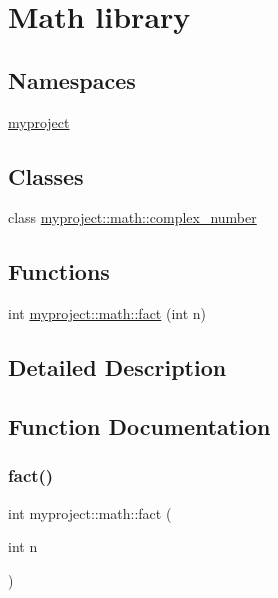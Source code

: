 \hypertarget{group__group__math}{}\section{Math library}
\label{group__group__math}
\subsection*{Namespaces}
\begin{DoxyCompactItemize}
\item 
 \hyperlink{namespacemyproject}{myproject}
\end{DoxyCompactItemize}
\subsection*{Classes}
\begin{DoxyCompactItemize}
\item 
class \hyperlink{classmyproject_1_1math_1_1complex__number}{myproject\+::math\+::complex\+\_\+number}
\end{DoxyCompactItemize}
\subsection*{Functions}
\begin{DoxyCompactItemize}
\item 
int \hyperlink{group__group__math_ga6068ca26852f38cc5dff403589631c1b}{myproject\+::math\+::fact} (int n)
\end{DoxyCompactItemize}


\subsection{Detailed Description}


\subsection{Function Documentation}
\mbox{\label{group__group__math_ga6068ca26852f38cc5dff403589631c1b}} 
\subsubsection{\texorpdfstring{fact()}{fact()}}
{\footnotesize\ttfamily int myproject\+::math\+::fact (\begin{DoxyParamCaption}\item[{int}]{n }\end{DoxyParamCaption})}

